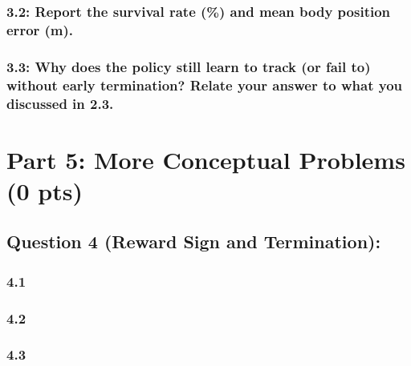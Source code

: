 \documentclass[12pt]{article}
\begin{document}
\subsubsection*{3.2: Report the survival rate (\%) and mean body position error (m).}
\begin{solution}[height=4cm]
\end{solution}

\subsubsection*{3.3: Why does the policy still learn to track (or fail to) without early termination? Relate your answer to what you discussed in 2.3.}
\begin{solution}[height=7cm]
\end{solution}


\newpage
\section*{Part 5: More Conceptual Problems (0 pts)}

\subsection*{Question 4 (Reward Sign and Termination):}

\subsubsection*{4.1}
\begin{solution}[height=6cm]
\end{solution}

\subsubsection*{4.2}
\begin{solution}[height=6cm]
\end{solution}

\subsubsection*{4.3}
\begin{solution}[height=6cm]
\end{solution}
\end{document}
